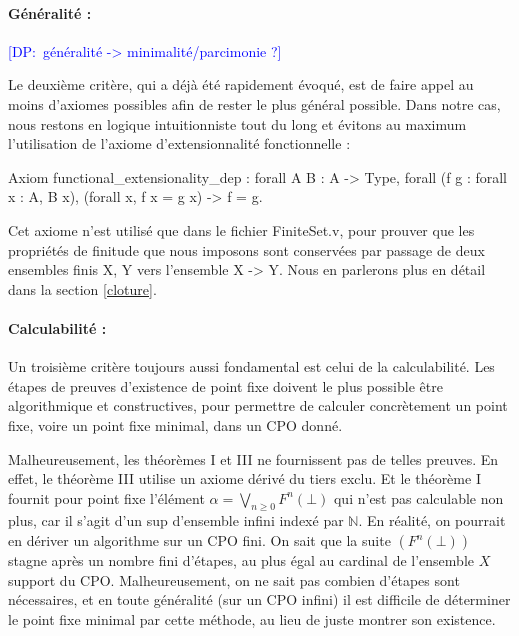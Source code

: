 \documentclass{article}
\newcommand\dam[1]{\textcolor{blue}{{[DP:~#1]}}}
\newcommand\code[1]{{\fontfamily{lmtt}\selectfont #1}}
\theoremstyle{definition}
\begin{document}
\paragraph{Généralité :\\}
\dam{généralité -> minimalité/parcimonie ?}

Le deuxième critère, qui a déjà été rapidement évoqué, est de faire appel au moins d'axiomes possibles afin de rester le plus général possible. Dans notre cas, nous restons en logique intuitionniste tout du long et évitons au maximum l'utilisation de l'axiome d'extensionnalité fonctionnelle :

\begin{coq}
Axiom functional_extensionality_dep : forall {A} {B : A -> Type},
  forall (f g : forall x : A, B x),
  (forall x, f x = g x) -> f = g.
\end{coq}

Cet axiome n'est utilisé que dans le fichier \code{FiniteSet.v}, pour prouver que les propriétés de finitude que nous imposons sont conservées par passage de deux ensembles finis \code{X, Y} vers l'ensemble \code{X -> Y}. Nous en parlerons plus en détail dans la section \ref{cloture}.

\paragraph{Calculabilité :\\}
\label{calculabilite}

Un troisième critère toujours aussi fondamental est celui de la calculabilité. Les étapes de preuves d'existence de point fixe doivent le plus possible être algorithmique et constructives, pour permettre de calculer concrètement un point fixe, voire un point fixe minimal, dans un CPO donné.

Malheureusement, les théorèmes I et III ne fournissent pas de telles preuves. En effet, le théorème III utilise un axiome dérivé du tiers exclu. Et le théorème I fournit pour point fixe l'élément $ \alpha = \bigvee_{n \geq 0} F^n(\bot)$ qui n'est pas calculable non plus, car il s'agit d'un sup d'ensemble infini indexé par $\mathbb{N}$. En réalité, on pourrait en dériver un algorithme sur un CPO fini. On sait que la suite $(F^n(\bot))$ stagne après un nombre fini d'étapes, au plus égal au cardinal de l'ensemble $X$ support du CPO. Malheureusement, on ne sait pas combien d'étapes sont nécessaires, et en toute généralité (sur un CPO infini) il est difficile de déterminer le point fixe minimal par cette méthode, au lieu de juste montrer son existence.
\end{document}
